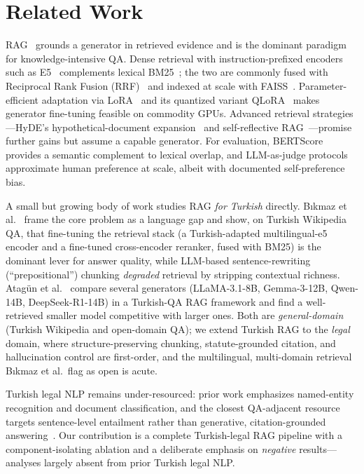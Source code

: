 \documentclass[conference]{IEEEtran}
\begin{document}
\section{Related Work}
RAG~\cite{lewis2020rag} grounds a generator in retrieved evidence and is the
dominant paradigm for knowledge-intensive QA. Dense retrieval with
instruction-prefixed encoders such as E5~\cite{wang2024e5} complements lexical
BM25~\cite{robertson2009bm25}; the two are commonly fused with Reciprocal Rank
Fusion (RRF)~\cite{cormack2009rrf} and indexed at scale with
FAISS~\cite{johnson2019faiss}. Parameter-efficient adaptation via
LoRA~\cite{hu2022lora} and its quantized variant QLoRA~\cite{dettmers2023qlora}
makes generator fine-tuning feasible on commodity GPUs. Advanced retrieval
strategies---HyDE's hypothetical-document expansion~\cite{gao2023hyde} and
self-reflective RAG~\cite{asai2024selfrag}---promise further gains but assume a
capable generator. For evaluation, BERTScore~\cite{zhang2020bertscore} provides
a semantic complement to lexical overlap, and LLM-as-judge
protocols~\cite{zheng2023judge} approximate human preference at scale, albeit
with documented self-preference bias.

A small but growing body of work studies RAG \emph{for Turkish} directly.
B\i kmaz et al.~\cite{bikmaz2025bridging} frame the core problem as a language
gap and show, on Turkish Wikipedia QA, that fine-tuning the retrieval stack (a
Turkish-adapted multilingual-e5 encoder and a fine-tuned cross-encoder reranker,
fused with BM25) is the dominant lever for answer quality, while LLM-based
sentence-rewriting (``prepositional'') chunking \emph{degraded} retrieval by
stripping contextual richness. Atag\"un et al.~\cite{atagun2025rag} compare
several generators (LLaMA-3.1-8B, Gemma-3-12B, Qwen-14B, DeepSeek-R1-14B) in a
Turkish-QA RAG framework and find a well-retrieved smaller model competitive
with larger ones. Both are \emph{general-domain} (Turkish Wikipedia and
open-domain QA); we extend Turkish RAG to the \emph{legal} domain, where
structure-preserving chunking, statute-grounded citation, and hallucination
control are first-order, and the multilingual, multi-domain retrieval B\i kmaz
et al.\ flag as open is acute.

Turkish legal NLP remains under-resourced: prior work emphasizes named-entity
recognition and document classification, and the closest QA-adjacent resource
targets sentence-level entailment rather than generative, citation-grounded
answering~\cite{turknli2024}. Our contribution is a complete Turkish-legal RAG
pipeline with a component-isolating ablation and a deliberate emphasis on
\emph{negative} results---analyses largely absent from prior Turkish legal NLP.
\end{document}
